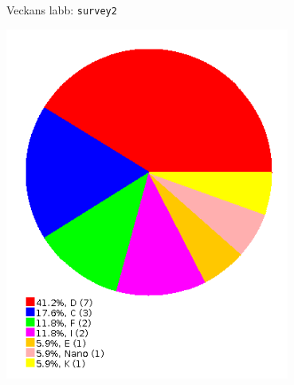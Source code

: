 \begin{Slide}{Veckans labb: \texttt{survey2}}
\begin{minipage}{0.27\textwidth}
\vspace{2em}\includegraphics[width=0.7\textwidth]{../img/survey/pie}
\end{minipage}
\end{Slide}







